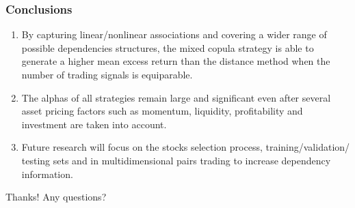\documentclass[pdf,9pt,xcolor=dvipsnames,hide notes]{beamer}
\begin{document}
\begin{frame}[label=frame5b2]
\frametitle{Conclusions}

\begin{enumerate}
	\justifying
	
\item By capturing linear/nonlinear associations and covering a wider range of possible dependencies structures, the mixed copula strategy is able to generate a higher mean excess return than the distance method when the number of trading signals is equiparable.

\vspace{0.3cm}

\item The alphas of all strategies remain large and significant even after several asset pricing factors such as momentum, liquidity, profitability and investment are taken into account.


\vspace{0.3cm}

\item Future research will focus on the stocks selection process, training/validation/ \newline testing sets and in multidimensional pairs trading to increase dependency information.
	
	
\end{enumerate}

\end{frame}

\begin{frame}
	
	\centering
	\Large{Thanks! Any questions?}
	
\end{frame}
\end{document}
